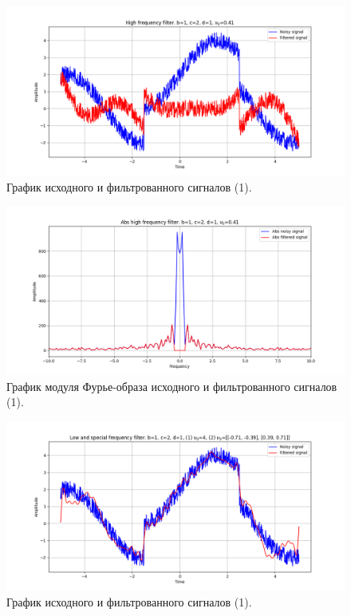 \documentclass[a4paper, 12pt]{article}
\begin{document}
    \begin{figure}[!htb]
        \centering
        \includegraphics[scale=0.48]{1_2_u_flt_u_nospec.png}
        \captionsetup{skip=0pt}
        \caption{График исходного и фильтрованного сигналов (1).}
        \label{fig:fig75}
    \end{figure}
    \begin{figure}[!htb]
        \centering
        \includegraphics[scale=0.48]{1_2_abs_u_U_nospec.png}
        \captionsetup{skip=0pt}
        \caption{График модуля Фурье-образа исходного и фильтрованного сигналов (1).}
        \label{fig:fig76}
    \end{figure}
    \begin{figure}[!htb]
        \centering
        \includegraphics[scale=0.48]{1_3_u_flt_u_nospec.png}
        \captionsetup{skip=0pt}
        \caption{График исходного и фильтрованного сигналов (1).}
        \label{fig:fig77}
    \end{figure}
\end{document}
